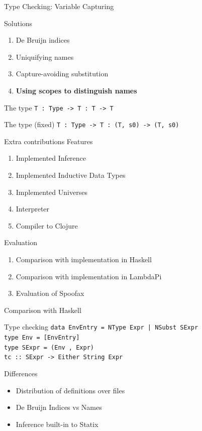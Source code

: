 \documentclass[aspectratio=43]{beamer}
\begin{document}
\begin{frame}[fragile]{Type Checking: Variable Capturing}
	\begin{block}{Solutions}
		\begin{enumerate}
			\item De Bruijn indices
			\item Uniquifying names
			\item Capture-avoiding substitution
			\item \textbf{Using scopes to distinguish names}
		\end{enumerate}
	\end{block}
	
	\begin{block}{The type}
		\texttt{T : Type -> T : T -> T}
	\end{block}
	
	\begin{block}{The type (fixed)}
		\texttt{T : Type -> T : (T, s0) -> (T, s0)}
	\end{block}
\end{frame}



\begin{frame}[fragile]{Extra contributions}
Features
\begin{enumerate}
	\item Implemented Inference
	\item Implemented Inductive Data Types
	\item Implemented Universes
	\item Interpreter
	\item Compiler to Clojure
\end{enumerate}
Evaluation
\begin{enumerate}
	\item Comparison with implementation in Haskell
	\item Comparison with implementation in LambdaPi
	\item Evaluation of Spoofax
\end{enumerate}
\end{frame}

\begin{frame}{Comparison with Haskell}
	\begin{block}{Type checking}
		\texttt{data EnvEntry = NType Expr | NSubst SExpr
			\\type Env = [EnvEntry]
			\\type SExpr = (Env , Expr)
			\\tc :: SExpr -> Either String Expr}
	\end{block}

	\begin{block}{Differences}
		\begin{itemize}
			\item Distribution of definitions over files
			\item De Bruijn Indices vs Names
			\item Inference built-in to Statix
		\end{itemize}
	\end{block}
\end{frame}
\end{document}
